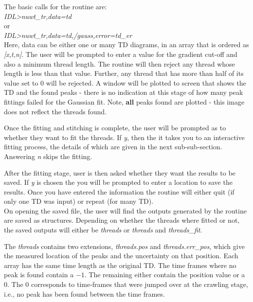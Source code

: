 \documentclass{article}
\begin{document}
The basic calls for the routine are: \\

\textit{IDL\textgreater nuwt\_tr,data=td} \\

or\\

\textit{IDL\textgreater nuwt\_tr,data=td,/gauss,error=td\_er} \\

 

Here, data can be either one or many TD diagrams, in an array that is ordered as \textit{[x,t,n]}.
The user will be prompted to enter a value for the gradient cut-off and also a minimum thread length. 
The routine will then reject any thread whose length is less than that value. Further, any thread that has 
more than half of its value set to 0 will be rejected. A window will be plotted to 
screen that shows the TD and the found peaks - there is no indication at this stage of how many peak 
fittings failed for the Gaussian fit. Note, \textbf{all} peaks found are plotted - this image does not reflect 
the threads found.

\medskip
Once the fitting and stitching is complete, the user will be prompted as to whether they want to fit the 
threads. If \textit{y}, then the it takes you to an interactive fitting process, the details of which are given 
in the next sub-sub-section. Answering \textit{n} skips the fitting.

After the fitting stage, user is then asked whether they want the results to be saved. If \textit{y} is chosen 
the you will be prompted to enter a location to save the results. Once you have entered the information 
the routine will either quit (if only one TD was input) or repeat (for many TD).\\

On opening the saved file, the user will find the outputs generated by the routine are saved as structures. 
Depending on whether the threads where fitted or not, the saved outputs will either be \textit{threads} or 
\textit{threads} and \textit{threads\_fit}.

The \textit{threads} contains two extensions, \textit{threads.pos} and \textit{threads.err\_pos}, which 
give the measured location of the peaks and the uncertainty on that position. Each array has the same 
time length as the original TD. The time frames where no peak is found contain a $-1$. The remaining 
either contain the position value or a 0. The 0 corresponds to time-frames that were jumped over at the
crawling stage, i.e., no peak has been found between the time frames. \\
\end{document}
